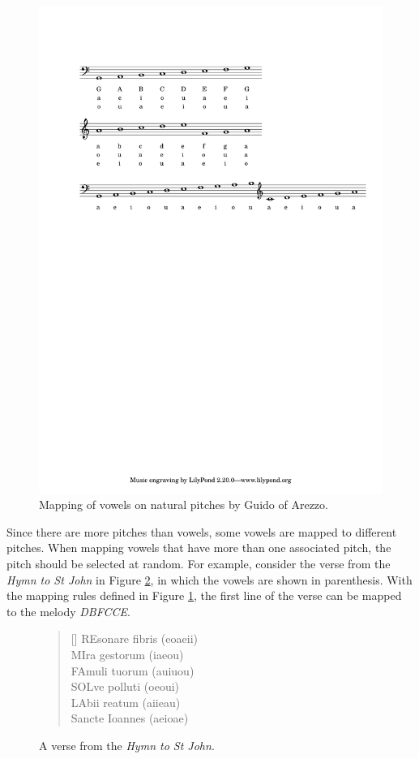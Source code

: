 \begin{figure}[!h]
 \centering
 \includegraphics[width=\columnwidth]{imgs/background/arezzo.pdf}
 \caption{Mapping of vowels on natural pitches by Guido of Arezzo.}
 \label{fig:arezzo}
\end{figure}

Since there are more pitches than vowels, some vowels are mapped to different pitches. When mapping vowels that have more than one associated pitch, the pitch should be selected at random. For example, consider the verse from the \textit{Hymn to St John} in Figure \ref{fig:hymn}, in which the vowels are shown in parenthesis. With the mapping rules defined in Figure \ref{fig:arezzo}, the first line of the verse can be mapped to the melody \textit{DBFCCE}.

\begin{figure}[!h]
\centering
\settowidth{\versewidth}{UT queant laxis,}
\begin{verse}[\versewidth]
    REsonare fibris (eoaeii) \\
    MIra gestorum (iaeou) \\
    FAmuli tuorum (auiuou) \\
    SOLve polluti (oeoui)\\
    LAbii reatum  (aiieau)\\
    Sancte Ioannes (aeioae)
\end{verse}
\caption{A verse from the \textit{Hymn to St John}.}
\label{fig:hymn}
\end{figure}

